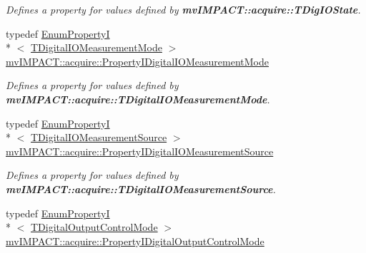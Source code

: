 \begin{DoxyCompactItemize}
\begin{DoxyCompactList}\small\item\em Defines a property for values defined by {\bfseries mv\+I\+M\+P\+A\+C\+T\+::acquire\+::\+T\+Dig\+I\+O\+State}. \end{DoxyCompactList}\item 
\hypertarget{group___device_specific_interface_ga6cece59259630b01f8e2854bcaa86337}{typedef \hyperlink{classmv_i_m_p_a_c_t_1_1acquire_1_1_enum_property_i}{Enum\+Property\+I}\\*
$<$ \hyperlink{group___device_specific_interface_ga85a0b4826a79540c0542e50616f287ad}{T\+Digital\+I\+O\+Measurement\+Mode} $>$ \hyperlink{group___device_specific_interface_ga6cece59259630b01f8e2854bcaa86337}{mv\+I\+M\+P\+A\+C\+T\+::acquire\+::\+Property\+I\+Digital\+I\+O\+Measurement\+Mode}}\label{group___device_specific_interface_ga6cece59259630b01f8e2854bcaa86337}

\begin{DoxyCompactList}\small\item\em Defines a property for values defined by {\bfseries mv\+I\+M\+P\+A\+C\+T\+::acquire\+::\+T\+Digital\+I\+O\+Measurement\+Mode}. \end{DoxyCompactList}\item 
\hypertarget{group___device_specific_interface_gab3270cf1acd74b272fe15c80f8fadfc4}{typedef \hyperlink{classmv_i_m_p_a_c_t_1_1acquire_1_1_enum_property_i}{Enum\+Property\+I}\\*
$<$ \hyperlink{group___device_specific_interface_gadcaf6d1f6549e591bf57e04cd7892b6a}{T\+Digital\+I\+O\+Measurement\+Source} $>$ \hyperlink{group___device_specific_interface_gab3270cf1acd74b272fe15c80f8fadfc4}{mv\+I\+M\+P\+A\+C\+T\+::acquire\+::\+Property\+I\+Digital\+I\+O\+Measurement\+Source}}\label{group___device_specific_interface_gab3270cf1acd74b272fe15c80f8fadfc4}

\begin{DoxyCompactList}\small\item\em Defines a property for values defined by {\bfseries mv\+I\+M\+P\+A\+C\+T\+::acquire\+::\+T\+Digital\+I\+O\+Measurement\+Source}. \end{DoxyCompactList}\item 
\hypertarget{group___device_specific_interface_ga00cd9778dbab384a83457d98ff8c3d97}{typedef \hyperlink{classmv_i_m_p_a_c_t_1_1acquire_1_1_enum_property_i}{Enum\+Property\+I}\\*
$<$ \hyperlink{group___device_specific_interface_ga8f01f0c294f3f5476c9b9ffcec55a80b}{T\+Digital\+Output\+Control\+Mode} $>$ \hyperlink{group___device_specific_interface_ga00cd9778dbab384a83457d98ff8c3d97}{mv\+I\+M\+P\+A\+C\+T\+::acquire\+::\+Property\+I\+Digital\+Output\+Control\+Mode}}\label{group___device_specific_interface_ga00cd9778dbab384a83457d98ff8c3d97}


\end{DoxyCompactItemize}
